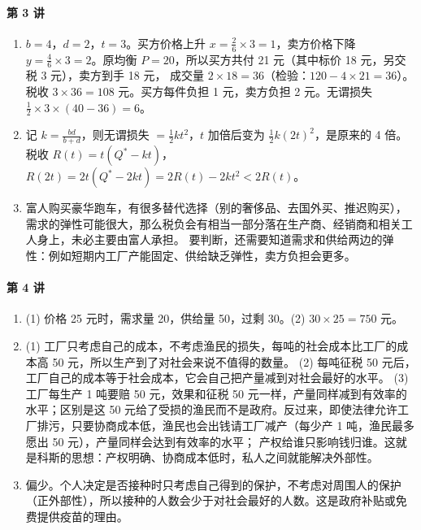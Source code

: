 \paragraph{第 3 讲}
\begin{enumerate}[label=3.\arabic*, leftmargin=2.6em]
  \item $b=4$，$d=2$，$t=3$。买方价格上升 $x=\frac{2}{6}\times3=1$，卖方价格下降 $y=\frac46\times3=2$。原均衡 $P=20$，所以买方共付 21 元（其中标价 18 元，另交税 3 元），卖方到手 18 元，
        成交量 $2\times18=36$（检验：$120-4\times21=36$）。税收 $3\times36=108$ 元。买方每件负担 1 元，卖方负担 2 元。无谓损失 $\frac12\times3\times(40-36)=6$。
  \item 记 $k=\frac{bd}{b+d}$，则无谓损失 $=\frac12kt^2$，$t$ 加倍后变为 $\frac12k(2t)^2$，是原来的 4 倍。税收 $R(t)=t(Q^*-kt)$，
        $R(2t)=2t(Q^*-2kt)=2R(t)-2kt^2<2R(t)$。
  \item 富人购买豪华跑车，有很多替代选择（别的奢侈品、去国外买、推迟购买），需求的弹性可能很大，那么税负会有相当一部分落在生产商、经销商和相关工人身上，未必主要由富人承担。
        要判断，还需要知道需求和供给两边的弹性：例如短期内工厂产能固定、供给缺乏弹性，卖方负担会更多。
\end{enumerate}

\paragraph{第 4 讲}
\begin{enumerate}[label=4.\arabic*, leftmargin=2.6em]
  \item (1) 价格 25 元时，需求量 20，供给量 50，过剩 30。(2) $30\times25=750$ 元。
  \item (1) 工厂只考虑自己的成本，不考虑渔民的损失，每吨的社会成本比工厂的成本高 50 元，所以生产到了对社会来说不值得的数量。
        (2) 每吨征税 50 元后，工厂自己的成本等于社会成本，它会自己把产量减到对社会最好的水平。
        (3) 工厂每生产 1 吨要赔 50 元，效果和征税 50 元一样，产量同样减到有效率的水平；区别是这 50 元给了受损的渔民而不是政府。反过来，即使法律允许工厂排污，只要协商成本低，渔民也会出钱请工厂减产（每少产 1 吨，渔民最多愿出 50 元），产量同样会达到有效率的水平；
        产权给谁只影响钱归谁。这就是科斯的思想：产权明确、协商成本低时，私人之间就能解决外部性。
  \item 偏少。个人决定是否接种时只考虑自己得到的保护，不考虑对周围人的保护（正外部性），所以接种的人数会少于对社会最好的人数。这是政府补贴或免费提供疫苗的理由。
\end{enumerate}

